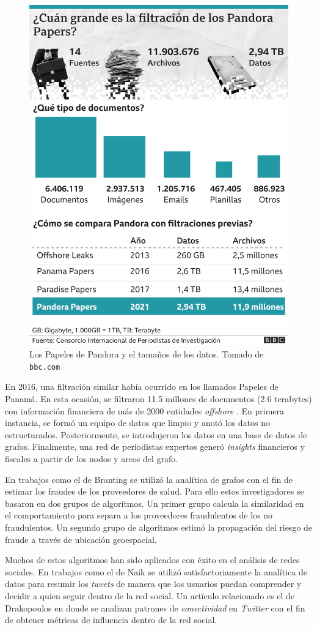 \documentclass[11pt,letterpaper,oneside]{article}
\begin{document}
	\begin{figure}[h]
		\centering
		\includegraphics[width=0.6\linewidth]{../img/pandora_info}
		\caption[]{Los Papeles de Pandora y el tamaños de los datos. Tomado de  \texttt{bbc.com} \cite{BBC-2021}}
		\label{fig:pandorainfo}
	\end{figure}

	En 2016, una filtración similar había ocurrido en los llamados Papeles de Panamá. En esta ocasión, se filtraron 11.5 millones de documentos (2.6 terabytes) con información financiera de más de 2000 entidades \textit{offshore} \cite{mukhopadhyay-2020}. En primera instancia, se formó un equipo de datos que limpio y anotó los datos no estructurados. Posteriormente, se introdujeron los datos en una base de datos de grafos. Finalmente, una red de periodistas expertos generó \textit{insights} financieros y fiscales a partir de los nodos y arcos del grafo.
	
	
	En trabajos como el de Branting \cite{Branting-2016} se utilizó la analítica de grafos con el fin de estimar los fraudes de los proveedores de salud. Para ello estos investigadores se basaron en dos grupos de algoritmos. Un primer grupo calcula la similaridad en el comportamiento para separa a los proveedores fraudulentos de los no fraudulentos. Un segundo grupo de algoritmos estimó la propagación del riesgo de fraude a través de ubicación geoespacial.
	
	Muchos de estos algoritmos han sido aplicados con éxito en el análisis de redes sociales. En trabajos como el de Naik \cite{Naik-2017} se utilizó satisfactoriamente la analítica de datos para resumir los \textit{tweets} de manera que los usuarios puedan comprender y decidir a quien seguir dentro de la red social. Un artículo relacionado es el de Drakopoulos \cite{Drakopoulos-2017} en donde se analizan patrones de \textit{conectividad} en \textit{Twitter} con el fin de obtener métricas de influencia dentro de la red social.
	
\end{document}
